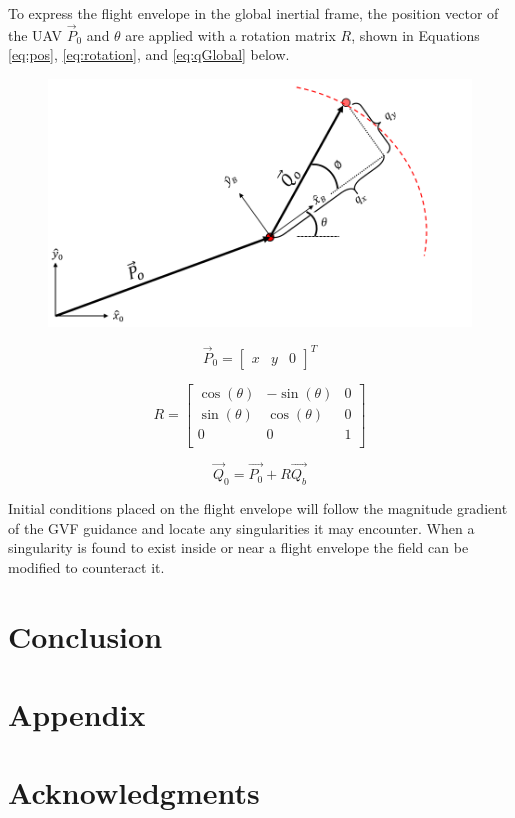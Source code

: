 \documentclass[conf]{new-aiaa}
\begin{document}
To express the flight envelope in the global inertial frame, the position vector of the UAV $\overrightarrow{P}_0$ and $\theta$ are applied with a rotation matrix $R$, shown in Equations \ref{eq:pos}, \ref{eq:rotation}, and \ref{eq:qGlobal} below. 


\begin{figure}[H]
	\centering
	\includegraphics[width=0.7\linewidth]{Figures/methods/flightEnvelope}
	\caption{}
	\label{fig:flightenvelope}
\end{figure}


\begin{equation}
\label{eq:rotation}
\overrightarrow{P}_0 = \begin{bmatrix}
x & y & 0
\end{bmatrix}^T
\end{equation}


\begin{equation}
\label{eq:qGlobal}
   R=\begin{bmatrix}
	\cos(\theta) & -\sin(\theta) & 0 \\
	\sin(\theta) & \cos(\theta) & 0 \\
	0 & 0 & 1 \\
\end{bmatrix}
\end{equation}


\begin{equation}
\label{eq:pos}
\overrightarrow{Q}_0 = \overrightarrow{P_0} + R  \overrightarrow{Q_b}
\end{equation}


Initial conditions placed on the flight envelope will follow the magnitude gradient of the GVF guidance and locate any singularities it may encounter. When a singularity is found to exist inside or near a flight envelope the field can be modified to counteract it. 




\section{Conclusion}



\section*{Appendix}



\section*{Acknowledgments}


\end{document}
